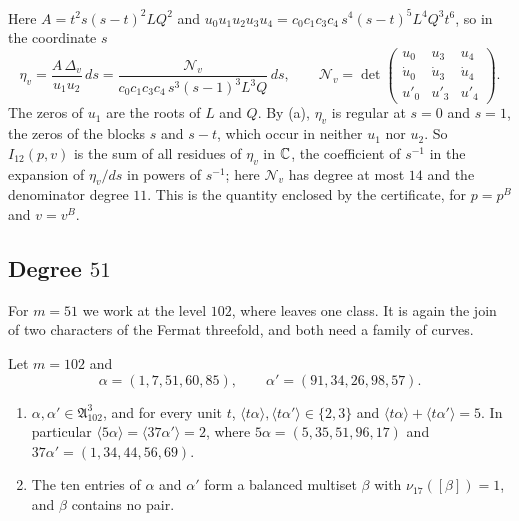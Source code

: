 Here $A=t^{2}s(s-t)^{2}LQ^{2}$ and $u_{0}u_{1}u_{2}u_{3}u_{4}=c_{0}c_{1}
c_{3}c_{4}\,s^{4}(s-t)^{5}L^{4}Q^{3}t^{6}$, so in the coordinate $s$
\[
  \eta_{v}=\frac{A\,\Delta_{v}}{u_{1}u_{2}}\,ds=\frac{\mathcal N_{v}}
  {c_{0}c_{1}c_{3}c_{4}\,s^{3}(s-1)^{3}L^{3}Q}\,ds,\qquad\mathcal N_{v}=
  \det\begin{pmatrix}u_{0}&u_{3}&u_{4}\\ \dot u_{0}&\dot u_{3}&\dot u_{4}\\
  u'_{0}&u'_{3}&u'_{4}\end{pmatrix}.
\]
The zeros of $u_{1}$ are the roots of $L$ and $Q$. By
(a), $\eta_{v}$ is regular at $s=0$ and $s=1$, the zeros
of the blocks $s$ and $s-t$, which occur in neither $u_{1}$ nor $u_{2}$. So
$I_{12}(p,v)$ is the sum of all residues of $\eta_{v}$ in $\mathbb{C}$, the
coefficient of $s^{-1}$ in the expansion of $\eta_{v}/ds$ in powers of
$s^{-1}$; here $\mathcal N_{v}$ has degree at most $14$ and the denominator
degree $11$. This is the quantity enclosed by the certificate, for $p=p^{B}$
and $v=v^{B}$.

\subsection{Degree \texorpdfstring{$51$}{51}}\label{ssec:degree51}
For $m=51$ we work at the level $102$, where  leaves one
class. It is again the join of two characters of the Fermat threefold, and
both need a family of curves.

\begin{lemma}\label{lem:char51}
Let $m=102$ and
\[
  \alpha=(1,7,51,60,85),\qquad \alpha'=(91,34,26,98,57).
\]
\begin{enumerate}[label=\textup{(\alph*)}]
\item $\alpha,\alpha'\in\mathfrak A^{3}_{102}$, and for every unit $t$,
$\langle t\alpha\rangle,\langle t\alpha'\rangle\in\{2,3\}$ and $\langle
t\alpha\rangle+\langle t\alpha'\rangle=5$. In particular $\langle5\alpha
\rangle=\langle37\alpha'\rangle=2$, where $5\alpha=(5,35,51,96,17)$ and
$37\alpha'=(1,34,44,56,69)$.
\item The ten entries of $\alpha$ and $\alpha'$ form a balanced multiset
$\beta$ with $\nu_{17}([\beta])=1$, and $\beta$ contains no pair.
\end{enumerate}
\end{lemma}

